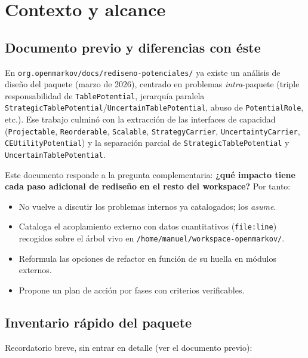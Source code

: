 \documentclass[11pt,a4paper]{article}
\newcommand{\code}[1]{\texttt{#1}}
\begin{document}
\section{Contexto y alcance}

\subsection{Documento previo y diferencias con éste}

En \code{org.openmarkov/docs/rediseno-potenciales/} ya existe un análisis de
diseño del paquete (marzo de 2026), centrado en problemas \emph{intra}-paquete
(triple responsabilidad de \code{TablePotential}, jerarquía paralela
\code{Strategic\-Table\-Potential}/\code{Uncertain\-Table\-Potential}, abuso de
\code{PotentialRole}, etc.). Ese trabajo culminó con la extracción de las
interfaces de capacidad (\code{Projectable}, \code{Reorderable}, \code{Scalable},
\code{StrategyCarrier}, \code{UncertaintyCarrier}, \code{CEUtilityPotential}) y
la separación parcial de \code{Strategic\-Table\-Potential} y
\code{Uncertain\-Table\-Potential}.

Este documento responde a la pregunta complementaria: \textbf{¿qué impacto
tiene cada paso adicional de rediseño en el resto del workspace?} Por tanto:

\begin{itemize}[leftmargin=*]
  \item No vuelve a discutir los problemas internos ya catalogados; los
        \emph{asume}.
  \item Cataloga el acoplamiento externo con datos cuantitativos
        (\code{file:line}) recogidos sobre el árbol vivo en
        \code{/home/manuel/workspace-openmarkov/}.
  \item Reformula las opciones de refactor en función de su huella en módulos
        externos.
  \item Propone un plan de acción por fases con criterios verificables.
\end{itemize}

\subsection{Inventario rápido del paquete}

Recordatorio breve, sin entrar en detalle (ver el documento previo):
\end{document}

